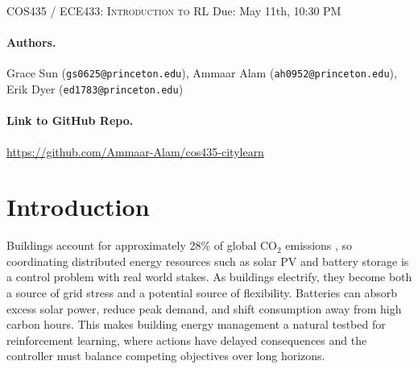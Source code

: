 \documentclass{article}
\author{}
\begin{document}
\newcommand{\lectureTitle}{Generalizable RL for Neighborhood Battery Control in CityLearn}
\newcommand{\lectureDate}{Due: May 11th, 10:30 PM}

\textsc{COS435 / ECE433: Introduction to RL}
\vspace{1em} \hfill \lectureDate

\maketitle
\setlength{\headheight}{28pt}

\paragraph{Authors.} Grace Sun (\texttt{gs0625@princeton.edu}), Ammaar Alam (\texttt{ah0952@princeton.edu}), Erik Dyer (\texttt{ed1783@princeton.edu}) 

\paragraph{Link to GitHub Repo.} \url{https://github.com/Ammaar-Alam/cos435-citylearn}

\section{Introduction}

Buildings account for approximately 28\% of global CO$_2$ emissions \citep{iea2022buildings}, so coordinating distributed energy resources such as solar PV and battery storage is a control problem with real world stakes. As buildings electrify, they become both a source of grid stress and a potential source of flexibility. Batteries can absorb excess solar power, reduce peak demand, and shift consumption away from high carbon hours. This makes building energy management a natural testbed for reinforcement learning, where actions have delayed consequences and the controller must balance competing objectives over long horizons.
\end{document}
